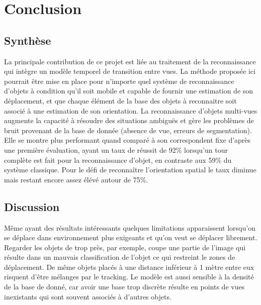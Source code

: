 \chapter{Conclusion}

\section{Synthèse} 
La principale contribution de ce projet est liée au traitement de la reconnaissance qui intègre un modèle temporel de transition entre vues. La méthode proposée ici pourrait être mise en place pour n'importe quel système de reconnaissance d'objets à condition qu'il soit mobile et capable de fournir une estimation de son déplacement, et que chaque élément de la base des objets à reconnaitre soit associé à une estimation de son orientation. La reconnaissance d'objets multi-vues augmente la capacité à résoudre des situations ambiguës et gère les problèmes de bruit provenant de la base de donnée (absence de vue, erreurs de segmentation). Elle se montre plus performant quand comparé à son correspondent fixe d'après une première évaluation, ayant un taux de réussit de 92\% lorsqu'un tour complète est fait pour la reconnaissance d'objet, en contraste aux 59\% du système classique. Pour le défi de reconnaître l'orientation spatial le taux diminue mais restant encore assez élévé autour de 75\%.

\section{Discussion} 
Même ayant des résultats intéressants quelques limitations apparaissent lorsqu'on se déplace dans environnement plus exigeants et qu'on veut se déplacer librement. Regarder les objets de trop près, par exemple, coupe une partie de l'image qui résulte dans un mauvais classification de l'objet ce qui restreint le zones de déplacement. De même objets placés à une distance inférieur à 1 mètre entre eux risquent d'être mélanges par le tracking. Le modèle est aussi sensible à la densité de la base de donné, car avoir une base trop discrète résulte en points de vues inexistants qui sont souvent associés à d'autres objets. 

